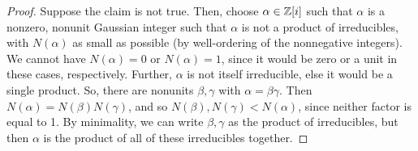 \begin{proof}
    Suppose the claim is not true. Then, choose $\alpha \in \mathbb{Z}[i]$ such that $\alpha$ is a nonzero, nonunit Gaussian integer such that $\alpha$ is not a product of irreducibles, with $N(\alpha)$ as small as possible (by well-ordering of the nonnegative integers). We cannot have $N(\alpha) = 0$ or $N(\alpha) = 1$, since it would be zero or a unit in these cases, respectively. Further, $\alpha$ is not itself irreducible, else it would be a single product. So, there are nonunits $\beta,\gamma$ with $\alpha = \beta\gamma$. Then $N(\alpha) = N(\beta)N(\gamma)$, and so $N(\beta),N(\gamma) < N(\alpha)$, since neither factor is equal to 1. By minimality, we can write $\beta,\gamma$ as the product of irreducibles, but then $\alpha$ is the product of all of these irreducibles together.
\end{proof}
